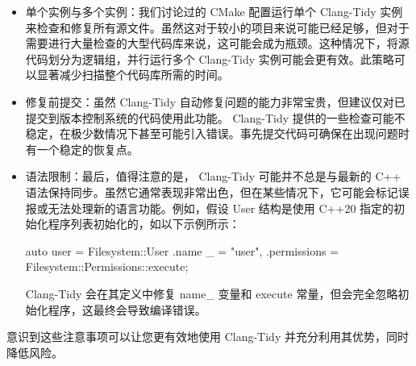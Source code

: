 \begin{itemize}
\item
单个实例与多个实例：我们讨论过的 CMake 配置运行单个 Clang-Tidy 实例来检查和修复所有源文件。虽然这对于较小的项目来说可能已经足够，但对于需要进行大量检查的大型代码库来说，这可能会成为瓶颈。这种情况下，将源代码划分为逻辑组，并行运行多个 Clang-Tidy 实例可能会更有效。此策略可以显著减少扫描整个代码库所需的时间。

\item
修复前提交：虽然 Clang-Tidy 自动修复问题的能力非常宝贵，但建议仅对已提交到版本控制系统的代码使用此功能。 Clang-Tidy 提供的一些检查可能不稳定，在极少数情况下甚至可能引入错误。事先提交代码可确保在出现问题时有一个稳定的恢复点。

\item
语法限制：最后，值得注意的是， Clang-Tidy 可能并不总是与最新的 C++ 语法保持同步。虽然它通常表现非常出色，但在某些情况下，它可能会标记误报或无法处理新的语言功能。例如，假设 User 结构是使用 C++20 指定的初始化程序列表初始化的，如以下示例所示：

\begin{cpp}
auto user = Filesystem::User{
    .name _ = "user", .permissions =
Filesystem::Permissions::execute};
\end{cpp}

Clang-Tidy 会在其定义中修复 name\_ 变量和 execute 常量，但会完全忽略初始化程序，这最终会导致编译错误。
\end{itemize}

意识到这些注意事项可以让您更有效地使用 Clang-Tidy 并充分利用其优势，同时降低风险。
